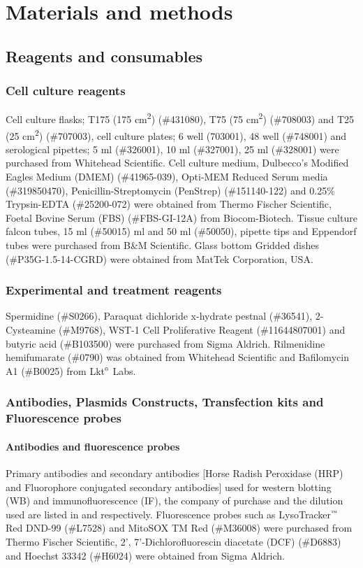 \chapter{Materials and methods}
\section{Reagents and consumables}
\subsection{Cell culture reagents}
Cell culture flasks; T175 (175 cm\textsuperscript{2}) (\#431080), T75 (75 cm\textsuperscript{2}) (\#708003) and T25 (25 cm\textsuperscript{2}) (\#707003), cell culture plates; 6 well (703001), 48 well (\#748001) and serological pipettes; 5 ml (\#326001), 10 ml (\#327001), 25 ml (\#328001) were purchased from Whitehead Scientific. Cell culture medium, Dulbecco’s Modified Eagles Medium (DMEM) (\#41965-039), Opti-MEM Reduced Serum media (\#319850470), Penicillin-Streptomycin (PenStrep) (\#151140-122) and 0.25\% Trypsin-EDTA (\#25200-072) were obtained from Thermo Fischer Scientific, Foetal Bovine Serum (FBS) (\#FBS-GI-12A) from Biocom-Biotech. Tissue culture falcon tubes, 15 ml (\#50015) ml and 50 ml (\#50050), pipette tips and Eppendorf tubes were purchased from B\&M Scientific. Glass bottom Gridded dishes (\#P35G-1.5-14-CGRD) were obtained from MatTek Corporation, USA.

\subsection{Experimental and treatment reagents}
Spermidine (\#S0266), Paraquat dichloride x-hydrate pestnal (\#36541), 2-Cysteamine (\#M9768), WST-1 Cell Proliferative Reagent (\#11644807001) and butyric acid (\#B103500) were purchased from Sigma Aldrich. Rilmenidine hemifumarate (\#0790) was obtained from Whitehead Scientific and Bafilomycin A1 (\#B0025) from Lkt${\textsuperscript{\tiny{\textregistered}}}$ Labs. 

\subsection{Antibodies, Plasmids Constructs, Transfection kits and Fluorescence probes}
\subsubsection{Antibodies and fluorescence probes}
Primary antibodies and secondary antibodies [Horse Radish Peroxidase (HRP) and Fluorophore conjugated secondary antibodies] used for western blotting (WB) and immunofluorescence (IF), the company of purchase and the dilution used are listed in  and  respectively. Fluorescence probes such as LysoTracker${\textsuperscript{\tiny{\texttrademark}}}$ Red DND-99 (\#L7528) and MitoSOX TM Red (\#M36008) were purchased from Thermo Fischer Scientific, 2', 7'-Dichlorofluorescin diacetate (DCF) (\#D6883) and Hoechst 33342 (\#H6024) were obtained from Sigma Aldrich.


